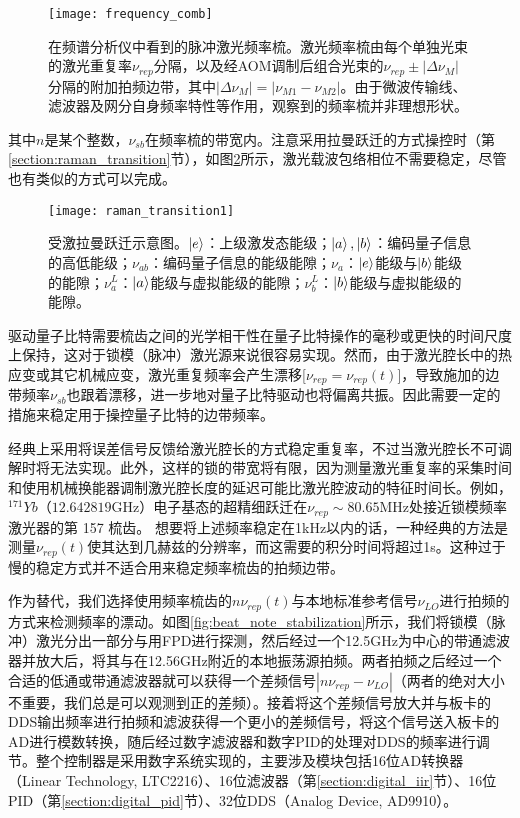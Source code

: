 \begin{figure}
    \centering
    \caption[脉冲激光频率梳]{在频谱分析仪中看到的脉冲激光频率梳。激光频率梳由每个单独光束的激光重复率$\nu_{rep}$分隔，以及经AOM调制后组合光束的$\nu_{rep}\pm |\Delta \nu_M|$分隔的附加拍频边带，其中$|\Delta \nu_M|=|\nu_{M1}-\nu_{M2}|$。由于微波传输线、滤波器及网分自身频率特性等作用，观察到的频率梳并非理想形状。\label{fig:frequency_comb}}
    \texttt{[image: frequency\_comb]}
\end{figure}

其中$n$是某个整数，$\nu_{sb}$在频率梳的带宽内。注意采用拉曼跃迁的方式操控时（第\ref{section:raman_transition}节），如图\ref{fig:raman_transition1}所示，激光载波包络相位不需要稳定\cite[]{Peer_Shapiro_Stowe_Shapiro_Ye_2007}，尽管也有类似的方式可以完成\cite[]{Koke_Grebing_Frei_Anderson_Assion_Steinmeyer_2010}。

\begin{figure}
    \centering
    \caption[受激拉曼跃迁示意图]{受激拉曼跃迁示意图。$\ket{e}$：上级激发态能级；$\ket{a},\ket{b}$：编码量子信息的高低能级；$\nu_{ab}$：编码量子信息的能级能隙；$\nu_{a}$：$\ket{e}$能级与$\ket{b}$能级的能隙；$\nu_a^L$：$\ket{a}$能级与虚拟能级的能隙；$\nu_b^L$：$\ket{b}$能级与虚拟能级的能隙。\label{fig:raman_transition1}}
    \texttt{[image: raman\_transition1]}
\end{figure}

驱动量子比特需要梳齿之间的光学相干性在量子比特操作的毫秒或更快的时间尺度上保持，这对于锁模（脉冲）激光源来说很容易实现\cite[]{Hayes_Matsukevich_Maunz_Hucul_Quraishi_Olmschenk_Campbell_Mizrahi_Senko_Monroe_2010}。然而，由于激光腔长中的热应变或其它机械应变，激光重复频率会产生漂移[$\nu_{rep}=\nu_{rep}(t)$]，导致施加的边带频率$\nu_{sb}$也跟着漂移，进一步地对量子比特驱动也将偏离共振。因此需要一定的措施来稳定用于操控量子比特的边带频率。

经典上采用将误差信号反馈给激光腔长的方式稳定重复率，不过当激光腔长不可调解时将无法实现。此外，这样的锁的带宽将有限，因为测量激光重复率的采集时间和使用机械换能器调制激光腔长度的延迟可能比激光腔波动的特征时间长。例如，$^{171}Yb$（$12.642819 $GHz）电子基态的超精细跃迁在$ \nu_{rep} \sim 80.65$MHz处接近锁模频率激光器的第 157 梳齿。
想要将上述频率稳定在1kHz以内的话，一种经典的方法是测量$\nu_{rep}(t)$使其达到几赫兹的分辨率，而这需要的积分时间将超过1s。这种过于慢的稳定方式并不适合用来稳定频率梳齿的拍频边带。

作为替代，我们选择使用频率梳齿的$n\nu_{rep}(t)$与本地标准参考信号$\nu_{LO}$进行拍频的方式来检测频率的漂动。如图\ref{fig:beat_note_stabilization}所示，我们将锁模（脉冲）激光分出一部分与用FPD进行探测，然后经过一个12.5GHz为中心的带通滤波器并放大后，将其与在12.56GHz附近的本地振荡源拍频。两者拍频之后经过一个合适的低通或带通滤波器就可以获得一个差频信号$|n\nu_{rep}-\nu_{LO}|$（两者的绝对大小不重要，我们总是可以观测到正的差频）。接着将这个差频信号放大并与板卡的DDS输出频率进行拍频和滤波获得一个更小的差频信号，将这个信号送入板卡的AD进行模数转换，随后经过数字滤波器和数字PID的处理对DDS的频率进行调节。整个控制器是采用数字系统实现的，主要涉及模块包括16位AD转换器（Linear Technology, LTC2216）、16位滤波器（第\ref{section:digital_iir}节）、16位PID（第\ref{section:digital_pid}节）、32位DDS（Analog Device, AD9910）。



